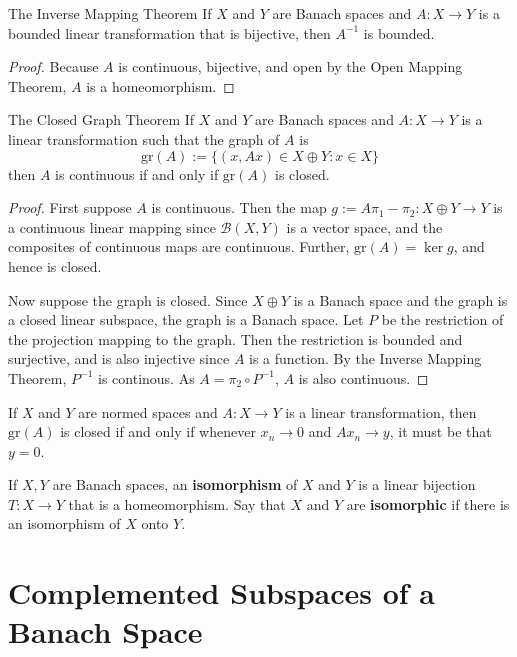 \begin{nthm}{The Inverse Mapping Theorem}
    If $X$ and $Y$ are Banach spaces and $A:X\rightarrow Y$ is a bounded linear transformation that is bijective, then $A^{-1}$ is bounded.
\end{nthm}
\begin{proof}
    Because $A$ is continuous, bijective, and open by the Open Mapping Theorem, $A$ is a homeomorphism.
\end{proof}

\begin{nthm}{The Closed Graph Theorem}
    If $X$ and $Y$ are Banach spaces and $A:X\rightarrow Y$ is a linear transformation such that the graph of $A$ is $$\text{gr}(A) := \{(x,Ax) \in X\oplus Y:x \in X\}$$
    then $A$ is continuous if and only if $\text{gr}(A)$ is closed.
\end{nthm}
\begin{proof}
    First suppose $A$ is continuous. Then the map $g := A\pi_1-\pi_2:X\oplus Y\rightarrow Y$ is a continuous linear mapping since $\mathscr{B}(X,Y)$ is a vector space, and the composites of continuous maps are continuous. Further, $\text{gr}(A) = \ker g$, and hence is closed.

    Now suppose the graph is closed. Since $X\oplus Y$ is a Banach space and the graph is a closed linear subspace, the graph is a Banach space. Let $P$ be the restriction of the projection mapping to the graph. Then the restriction is bounded and surjective, and is also injective since $A$ is a function. By the Inverse Mapping Theorem, $P^{-1}$ is continous. As $A = \pi_2\circ P^{-1}$, $A$ is also continuous.
\end{proof}


\begin{prop}
    If $X$ and $Y$ are normed spaces and $A:X\rightarrow Y$ is a linear transformation, then $\text{gr}(A)$ is closed if and only if whenever $x_n\rightarrow 0$ and $Ax_n\rightarrow y$, it must be that $y = 0$.
\end{prop}

\begin{defn}
    If $X,Y$ are Banach spaces, an \textbf{isomorphism} of $X$ and $Y$ is a linear bijection $T:X\rightarrow Y$ that is a homeomorphism. Say that $X$ and $Y$ are \textbf{isomorphic} if there is an isomorphism of $X$ onto $Y$.
\end{defn}


\section{Complemented Subspaces of a Banach Space}
\label{sec:comp}

